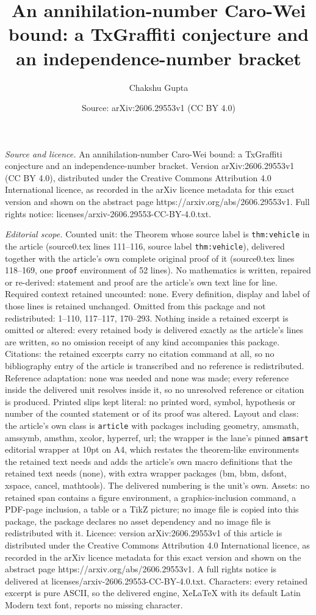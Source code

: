 \documentclass[10pt,a4paper]{amsart}
\title[An annihilation-number Caro-Wei bound: a TxGraffiti conjectu]{An annihilation-number Caro-Wei bound: a TxGraffiti conjecture and an independence-number bracket}
\author{Chakshu Gupta}
\date{Source: arXiv:2606.29553v1 (CC BY 4.0)}
\begin{document}
\maketitle

\noindent\emph{Source and licence.} An annihilation-number Caro-Wei bound: a TxGraffiti conjecture and an independence-number bracket. Version arXiv:2606.29553v1 (CC BY 4.0), distributed under the Creative Commons Attribution 4.0 International licence, as recorded in the arXiv licence metadata for this exact version and shown on the abstract page https://arxiv.org/abs/2606.29553v1. Full rights notice: licenses/arxiv-2606.29553-CC-BY-4.0.txt.\par\smallskip

\noindent\textit{Editorial scope.} Counted unit: the Theorem whose source label is \texttt{thm:vehicle} in the article (source0.tex lines 111--116, source label \texttt{thm:vehicle}), delivered together with the article's own complete original proof of it (source0.tex lines 118--169, one \texttt{proof} environment of 52 lines). No mathematics is written, repaired or re-derived: statement and proof are the article's own text line for line. Required context retained uncounted: none. Every definition, display and label of those lines is retained unchanged. Omitted from this package and not redistributed: 1--110, 117--117, 170--293. Nothing inside a retained excerpt is omitted or altered: every retained body is delivered exactly as the article's lines are written, so no omission receipt of any kind accompanies this package. Citations: the retained excerpts carry no citation command at all, so no bibliography entry of the article is transcribed and no reference is redistributed. Reference adaptation: none was needed and none was made; every reference inside the delivered unit resolves inside it, so no unresolved reference or citation is produced. Printed slips kept literal: no printed word, symbol, hypothesis or number of the counted statement or of its proof was altered. Layout and class: the article's own class is \texttt{article} with packages including geometry, amsmath, amssymb, amsthm, xcolor, hyperref, url; the wrapper is the lane's pinned \texttt{amsart} editorial wrapper at 10pt on A4, which restates the theorem-like environments the retained text needs and adds the article's own macro definitions that the retained text needs (none), with extra wrapper packages (bm, bbm, dsfont, xspace, cancel, mathtools). The delivered numbering is the unit's own. Assets: no retained span contains a figure environment, a graphics-inclusion command, a PDF-page inclusion, a table or a TikZ picture; no image file is copied into this package, the package declares no asset dependency and no image file is redistributed with it. Licence: version arXiv:2606.29553v1 of this article is distributed under the Creative Commons Attribution 4.0 International licence, as recorded in the arXiv licence metadata for this exact version and shown on the abstract page https://arxiv.org/abs/2606.29553v1. A full rights notice is delivered at licenses/arxiv-2606.29553-CC-BY-4.0.txt. Characters: every retained excerpt is pure ASCII, so the delivered engine, XeLaTeX with its default Latin Modern text font, reports no missing character.
\end{document}
